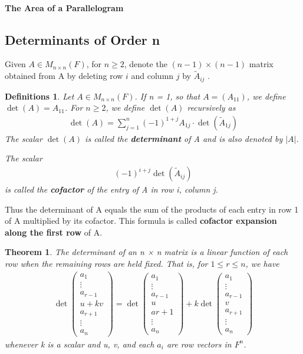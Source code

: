 \documentclass{article}
\newcommand{\bd}[1]{\textbf{#1}}
\newcommand*\bpmat[0]{\begin{pmatrix}}
\newcommand*\epmat[0]{\end{pmatrix}}
\theoremstyle{plain}
\newtheorem{theorem}{Theorem}[section]
\newtheorem*{definitions}{Definitions}
\theoremstyle{plain} %
\begin{document}
\paragraph{The Area of a Parallelogram}

\subsection{Determinants of Order n}

Given $A \in M_{n\times n}(F)$, for $n \geq 2$, denote the $(n−1)\times (n−1)$ matrix obtained from A by deleting row $i$ and column $j$ by $\tilde{A}_{ij}$ . 

\begin{definitions}
  Let $A \in M_{n\times n}(F)$. If n = 1, so that $A = (A_{11})$, we define $\det(A) = A_{11}$. For $n \geq 2$, we define $\det(A)$ recursively as
  \begin{align*}
    \det(A) = \sum_{j=1}^n {(-1)}^{1+j}A_{1j}\cdot \det(\tilde{A}_{1j})
  \end{align*}
  The scalar $\det(A)$ is called the \bd{determinant} of A and is also denoted by $|A|$.

  The scalar
  \begin{align*}
    {(−1)}^{i+j} \det(\tilde{A}_{ij})
  \end{align*}
  is called the \bd{cofactor} of the entry of A in row i, column j.
\end{definitions}

Thus the determinant of A equals the sum of the products of each entry in row 1 of A multiplied by its cofactor. This formula is called \bd{cofactor expansion along the first row} of A.

\begin{theorem}
  The determinant of an n × n matrix is a linear function of each row when the remaining rows are held fixed. That is, for $1 \leq  r \leq n$, we have
  \begin{align*}
    \det \bpmat a_1\\\vdots\\a_{r-1}\\u+kv\\a_{r+1}\\\vdots\\a_n\epmat =\det \bpmat a_1\\\vdots\\a_{r-1}\\u\\a{r+1}\\\vdots\\a_n\epmat +k\det \bpmat a_1\\\vdots\\a_{r-1}\\v\\a_{r+1}\\\vdots\\a_n\epmat
  \end{align*}
  whenever k is a scalar and u, v, and each $a_i$ are row vectors in $F^n$.
\end{theorem}
\end{document}
